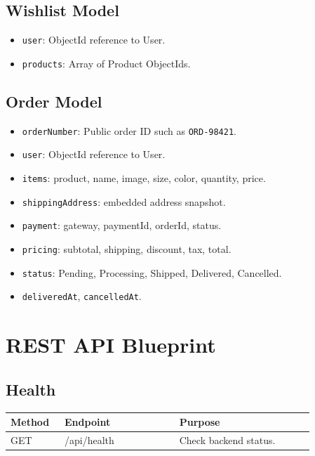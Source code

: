 \documentclass[11pt,a4paper]{article}
\begin{document}
\subsection{Wishlist Model}

\begin{itemize}
  \item \texttt{user}: ObjectId reference to User.
  \item \texttt{products}: Array of Product ObjectIds.
\end{itemize}

\subsection{Order Model}

\begin{itemize}
  \item \texttt{orderNumber}: Public order ID such as \texttt{ORD-98421}.
  \item \texttt{user}: ObjectId reference to User.
  \item \texttt{items}: product, name, image, size, color, quantity, price.
  \item \texttt{shippingAddress}: embedded address snapshot.
  \item \texttt{payment}: gateway, paymentId, orderId, status.
  \item \texttt{pricing}: subtotal, shipping, discount, tax, total.
  \item \texttt{status}: Pending, Processing, Shipped, Delivered, Cancelled.
  \item \texttt{deliveredAt}, \texttt{cancelledAt}.
\end{itemize}

\section{REST API Blueprint}

\subsection{Health}

\begin{longtable}{p{0.16\linewidth} p{0.34\linewidth} p{0.40\linewidth}}
\toprule
\textbf{Method} & \textbf{Endpoint} & \textbf{Purpose} \\
\midrule
GET & /api/health & Check backend status. \\
\bottomrule
\end{longtable}
\end{document}
